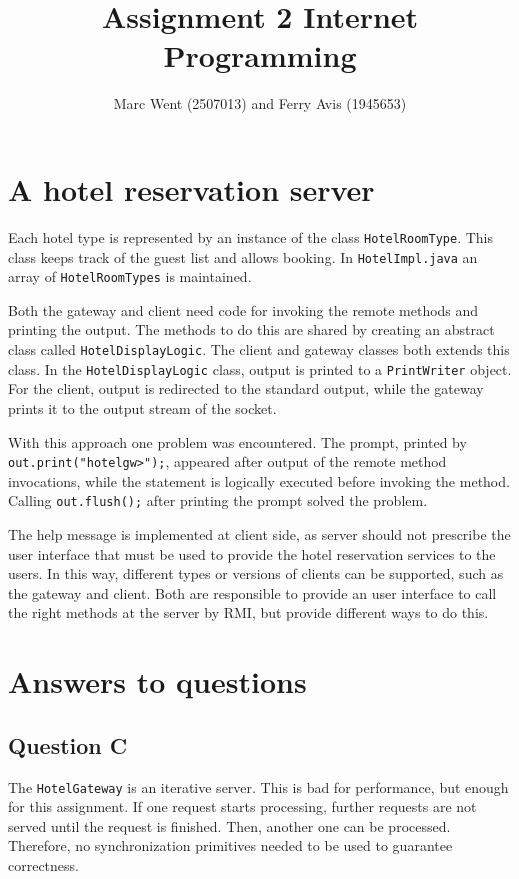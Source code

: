 \documentclass[11pt]{article}
\title{Assignment 2 Internet Programming}
\author{Marc Went (2507013) and Ferry Avis (1945653)}
\begin{document}
\maketitle

\section{A hotel reservation server}

Each hotel type is represented by an instance of the class \texttt{HotelRoomType}. This class keeps track of the guest list and allows booking. In \texttt{HotelImpl.java} an array of \texttt{HotelRoomTypes} is maintained.

Both the gateway and client need code for invoking the remote methods and printing the output. The methods to do this are shared by creating an abstract class called \texttt{HotelDisplayLogic}. The client and gateway classes both extends this class. In the \texttt{HotelDisplayLogic} class, output is printed to a \texttt{PrintWriter} object. For the client, output is redirected to the standard output, while the gateway prints it to the output stream of the socket.

With this approach one problem was encountered. The prompt, printed by \texttt{out.print("hotelgw>");}, appeared after output of the remote method invocations, while the statement is logically executed before invoking the method. Calling \texttt{out.flush();} after printing the prompt solved the problem.

The help message is implemented at client side, as server should not prescribe the user interface that must be used to provide the hotel reservation services to the users. In this way, different types or versions of clients can be supported, such as the gateway and client. Both are responsible to provide an user interface to call the right methods at the server by RMI, but provide different ways to do this.

\section{Answers to questions}

\subsection{Question C}

The \texttt{HotelGateway} is an iterative server. This is bad for performance, but enough for this assignment. If one request starts processing, further requests are not served until the request is finished. Then, another one can be processed. Therefore, no synchronization primitives needed to be used to guarantee correctness.
\end{document}

